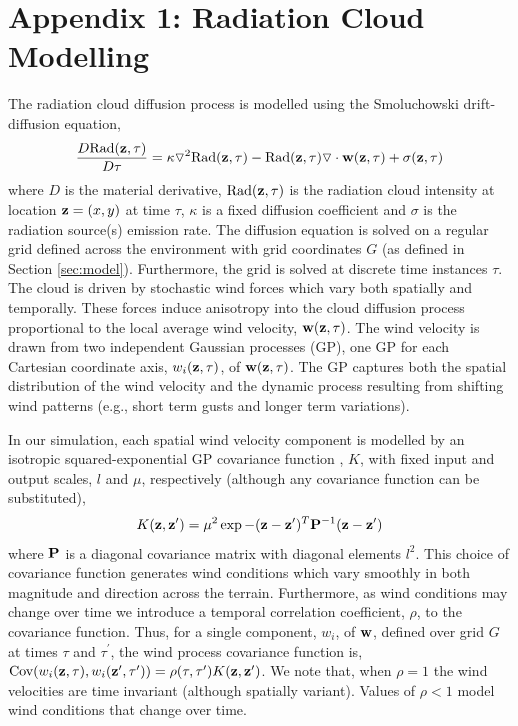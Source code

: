 \section*{Appendix 1: Radiation Cloud Modelling}\label{sec:radiation}
\noindent The radiation cloud diffusion process is modelled using the Smoluchowski drift-diffusion equation, 
\begin{eqnarray}
\frac{D \text{Rad}({\bf z}, \tau)}{D \tau}=\kappa \triangledown^2 \text{Rad}({\bf z},\tau)-\text{Rad}({\bf z},\tau)\triangledown \cdot {\bf w}({\bf z},\tau)+\sigma({\bf z},\tau)
\label{clouddyns}
\end{eqnarray}
where $D$ is the material derivative, $\text{Rad}({\bf z},\tau)$ is the radiation cloud intensity at location ${\bf z}=(x,y)$ at time $\tau$, $\kappa$ is a fixed diffusion coefficient and $\sigma$ is the radiation source(s) emission rate. The diffusion equation is solved on a regular grid defined across the environment with grid coordinates $G$ (as defined in Section \ref{sec:model}).  Furthermore, the grid is solved at discrete time instances $\tau$.  The cloud is driven by stochastic wind forces which vary both spatially and temporally.  These forces induce anisotropy into the cloud diffusion process  proportional to the local average wind velocity, ${\bf w}({\bf z},\tau)$.  The wind velocity is drawn from two independent Gaussian processes (GP), one GP for each Cartesian coordinate axis, $w_i({\bf z},\tau)$, of ${\bf w}({\bf z},\tau)$.  The GP captures both the spatial distribution of the wind velocity and the dynamic process resulting from shifting wind patterns (e.g., short term gusts and longer term variations). 

In our simulation, each spatial wind velocity component is modelled by an isotropic squared-exponential GP covariance function \cite{rasmussen06}, $K$, with fixed input and output scales, $l$ and $\mu$, respectively (although any covariance function can be substituted),
\begin{eqnarray*}
K({\bf z},{\bf z}^\prime)=\mu^2\exp -({\bf z}-{\bf z}^\prime)^T {\bf P}^{-1}({\bf z}-{\bf z}^\prime)
\end{eqnarray*}
where ${\bf P}$ is a diagonal covariance matrix with diagonal elements $l^2$.  This choice of covariance function generates wind conditions which vary smoothly in both magnitude and direction across the terrain.  Furthermore, as wind conditions may change over time we introduce a temporal correlation coefficient, $\rho$, to the covariance function.  Thus, for a single component, $w_i$, of ${\bf w}$, defined over grid $G$ at times $\tau$ and $\tau^\prime$, the wind process covariance function is, $\text{Cov}(w_i({\bf z},\tau),w_i({\bf z^\prime},\tau^\prime))=\rho(\tau,\tau^\prime) K({\bf z},{\bf z}^\prime)$.  We note that, when $\rho=1$ the wind velocities are time invariant (although spatially variant).  Values of $\rho<1$ model wind conditions that change over time.

